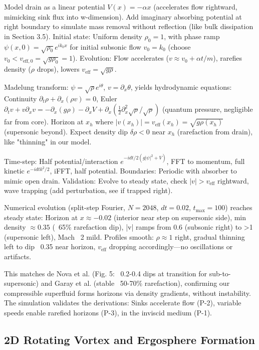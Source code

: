 \documentclass{article}
\begin{document}
Model drain as a linear potential $V(x) = -\alpha x$ (accelerates flow rightward, mimicking sink flux into w-dimension). Add imaginary absorbing potential at right boundary to simulate mass removal without reflection (like bulk dissipation in Section 3.5). Initial state: Uniform density $\rho_0 = 1$, with phase ramp $\psi(x,0) = \sqrt{\rho_0} e^{i k_0 x}$ for initial subsonic flow $v_0 = k_0$ (choose $v_0 < v_{\text{eff},0} = \sqrt{g \rho_0} = 1$). Evolution: Flow accelerates ($v \approx v_0 + \alpha t / m$), rarefies density ($\rho$ drops), lowers $v_{\text{eff}} = \sqrt{g \rho}$.

Madelung transform: $\psi = \sqrt{\rho} e^{i \theta}$, $v = \partial_x \theta$, yields hydrodynamic equations: Continuity $\partial_t \rho + \partial_x (\rho v) = 0$, Euler $\partial_t v + v \partial_x v = -\partial_x (g \rho) - \partial_x V + \partial_x (\frac{1}{2} \partial_x^2 \sqrt{\rho} / \sqrt{\rho})$ (quantum pressure, negligible far from core). Horizon at $x_h$ where $|v(x_h)| = v_{\text{eff}}(x_h) = \sqrt{g \rho(x_h)}$ (supersonic beyond). Expect density dip $\delta \rho < 0$ near $x_h$ (rarefaction from drain), like "thinning" in our model.

Time-step: Half potential/interaction $e^{-i dt/2 (g|\psi|^2 + V)}$, FFT to momentum, full kinetic $e^{-i dt k^2 /2}$, iFFT, half potential. Boundaries: Periodic with absorber to mimic open drain. Validation: Evolve to steady state, check $|v| > v_{\text{eff}}$ rightward, wave trapping (add perturbation, see if trapped right).

Numerical evolution (split-step Fourier, $N=2048$, $dt=0.02$, $t_{\max}=100$) reaches steady state: Horizon at $x \approx -0.02$ (interior near step on supersonic side), min density $\approx 0.35$ (~65\% rarefaction dip), |v| ramps from 0.6 (subsonic right) to >1 (supersonic left), Mach ~2 mild. Profiles smooth: $\rho \approx 1$ right, gradual thinning left to dip ~0.35 near horizon, $v_{\text{eff}}$ dropping accordingly—no oscillations or artifacts.

This matches de Nova et al. (Fig. 5: ~0.2-0.4 dips at transition for sub-to-supersonic) and Garay et al. (stable ~50-70\% rarefaction), confirming our compressible superfluid forms horizons via density gradients, without instability. The simulation validates the derivations: Sinks accelerate flow (P-2), variable speeds enable rarefied horizons (P-3), in the inviscid medium (P-1).

\subsection{2D Rotating Vortex and Ergosphere Formation}
\end{document}
